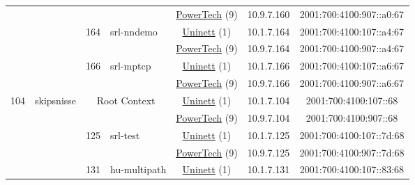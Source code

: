 \begin{small}
\begin{center}
\begin{longtable}{|c|c|c|c|c|c|c|c|}
  &  &  &  & \multicolumn{2}{|c|}{\tiny{\href{http://www.powertech.no}{PowerTech} (9)}} & \tiny{10.9.7.160} & \tiny{2001:700:4100:907::a0:67} \\* \cline{3-3}\cline{4-4}\cline{5-5}\cline{6-6}\cline{7-7}\cline{8-8}
  &  & \multirow{2}{*}{\tiny{164}} & \multicolumn{1}{|l|}{\multirow{2}{*}{\tiny{srl-nndemo}}} & \multicolumn{2}{|c|}{\tiny{\href{https://www.uninett.no}{Uninett} (1)}} & \tiny{10.1.7.164} & \tiny{2001:700:4100:107::a4:67} \\* \cline{5-5}\cline{6-6}\cline{7-7}\cline{8-8}
  &  &  &  & \multicolumn{2}{|c|}{\tiny{\href{http://www.powertech.no}{PowerTech} (9)}} & \tiny{10.9.7.164} & \tiny{2001:700:4100:907::a4:67} \\* \cline{3-3}\cline{4-4}\cline{5-5}\cline{6-6}\cline{7-7}\cline{8-8}
  &  & \multirow{2}{*}{\tiny{166}} & \multicolumn{1}{|l|}{\multirow{2}{*}{\tiny{srl-mptcp}}} & \multicolumn{2}{|c|}{\tiny{\href{https://www.uninett.no}{Uninett} (1)}} & \tiny{10.1.7.166} & \tiny{2001:700:4100:107::a6:67} \\* \cline{5-5}\cline{6-6}\cline{7-7}\cline{8-8}
  &  &  &  & \multicolumn{2}{|c|}{\tiny{\href{http://www.powertech.no}{PowerTech} (9)}} & \tiny{10.9.7.166} & \tiny{2001:700:4100:907::a6:67} \\ \hline
 \multirow{16}{*}{\tiny{104}} & \multicolumn{1}{|l|}{\multirow{16}{*}{\tiny{skipsnisse}}} & \multicolumn{2}{|c|}{\multirow{2}{*}{\tiny{Root Context}}} & \multicolumn{2}{|c|}{\tiny{\href{https://www.uninett.no}{Uninett} (1)}} & \tiny{10.1.7.104} & \tiny{2001:700:4100:107::68} \\* \cline{5-5}\cline{6-6}\cline{7-7}\cline{8-8}
  &  & \multicolumn{2}{|c|}{} & \multicolumn{2}{|c|}{\tiny{\href{http://www.powertech.no}{PowerTech} (9)}} & \tiny{10.9.7.104} & \tiny{2001:700:4100:907::68} \\* \cline{3-3}\cline{4-4}\cline{5-5}\cline{6-6}\cline{7-7}\cline{8-8}
  &  & \multirow{2}{*}{\tiny{125}} & \multicolumn{1}{|l|}{\multirow{2}{*}{\tiny{srl-test}}} & \multicolumn{2}{|c|}{\tiny{\href{https://www.uninett.no}{Uninett} (1)}} & \tiny{10.1.7.125} & \tiny{2001:700:4100:107::7d:68} \\* \cline{5-5}\cline{6-6}\cline{7-7}\cline{8-8}
  &  &  &  & \multicolumn{2}{|c|}{\tiny{\href{http://www.powertech.no}{PowerTech} (9)}} & \tiny{10.9.7.125} & \tiny{2001:700:4100:907::7d:68} \\* \cline{3-3}\cline{4-4}\cline{5-5}\cline{6-6}\cline{7-7}\cline{8-8}
  &  & \multirow{2}{*}{\tiny{131}} & \multicolumn{1}{|l|}{\multirow{2}{*}{\tiny{hu-multipath}}} & \multicolumn{2}{|c|}{\tiny{\href{https://www.uninett.no}{Uninett} (1)}} & \tiny{10.1.7.131} & \tiny{2001:700:4100:107::83:68} \\* \cline{5-5}\cline{6-6}\cline{7-7}\cline{8-8}

\end{longtable}
\end{center}
\end{small}
